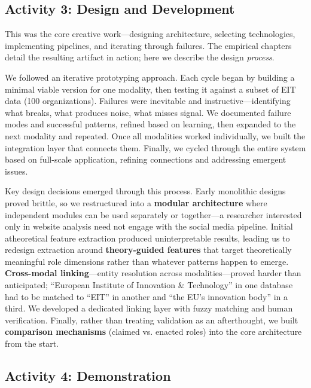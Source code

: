 \documentclass[../main.tex]{subfiles}
\begin{document}
\subsection{Activity 3: Design and Development}

This was the core creative work---designing architecture, selecting technologies, implementing pipelines, and iterating through failures. The empirical chapters detail the resulting artifact in action; here we describe the design \emph{process}.

We followed an iterative prototyping approach. Each cycle began by building a minimal viable version for one modality, then testing it against a subset of EIT data (100 organizations). Failures were inevitable and instructive---identifying what breaks, what produces noise, what misses signal. We documented failure modes and successful patterns, refined based on learning, then expanded to the next modality and repeated. Once all modalities worked individually, we built the integration layer that connects them. Finally, we cycled through the entire system based on full-scale application, refining connections and addressing emergent issues.

Key design decisions emerged through this process. Early monolithic designs proved brittle, so we restructured into a \textbf{modular architecture} where independent modules can be used separately or together---a researcher interested only in website analysis need not engage with the social media pipeline. Initial atheoretical feature extraction produced uninterpretable results, leading us to redesign extraction around \textbf{theory-guided features} that target theoretically meaningful role dimensions rather than whatever patterns happen to emerge. \textbf{Cross-modal linking}---entity resolution across modalities---proved harder than anticipated; ``European Institute of Innovation \& Technology'' in one database had to be matched to ``EIT'' in another and ``the EU's innovation body'' in a third. We developed a dedicated linking layer with fuzzy matching and human verification. Finally, rather than treating validation as an afterthought, we built \textbf{comparison mechanisms} (claimed vs. enacted roles) into the core architecture from the start.

\subsection{Activity 4: Demonstration}
\end{document}
